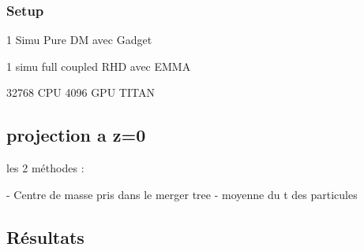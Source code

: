 \subsubsection{Setup}

1 Simu Pure DM avec Gadget 

1 simu full coupled RHD avec EMMA

32768 CPU
4096 GPU
TITAN


\subsection{projection a z=0}




les 2 méthodes :

- Centre de masse pris dans le merger tree
- moyenne du t des particules



\subsection{Résultats}


